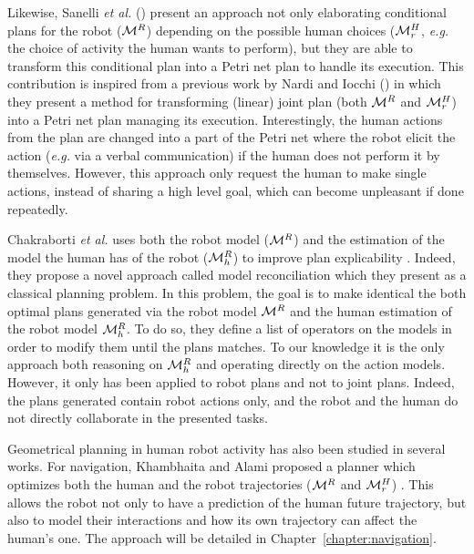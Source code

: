 \documentclass[a4paper,11pt,twoside]{StyleThese}
\begin{document}
Likewise, Sanelli \textit{et al.} (\cite{sanelli2017short}) present an approach not only elaborating conditional plans for the robot ($\mathcal{M}^R$)  depending on the possible human choices ($\mathcal{M}^H_r$, \textit{e.g.} the choice of activity the human wants to perform), but they are able to transform this conditional plan into a Petri net plan to handle its execution. This contribution is inspired from a previous work by Nardi and Iocchi (\cite{nardi2014representation}) in which they present a method for transforming (linear) joint plan (both $\mathcal{M}^R$ and $\mathcal{M}^H_r$) into a Petri net plan managing its execution. Interestingly, the human actions from the plan are changed into a part of the Petri net where the robot elicit the action (\textit{e.g.} via a verbal communication) if the human does not perform it by themselves. However, this approach only request the human to make single actions, instead of sharing a high level goal, which can become unpleasant if done repeatedly. 

Chakraborti \textit{et al.} uses both the robot model ($\mathcal{M}^R$) and the estimation of the model the human has of the robot ($\mathcal{M}^R_h$) to improve plan explicability \cite{chakraborti2017plan}. Indeed, they propose a novel approach called model reconciliation which they present as a classical planning problem. In this problem, the goal is to make identical the both optimal plans generated via the robot model $\mathcal{M}^R$ and the human estimation of the robot model $\mathcal{M}^R_h$. To do so, they define a list of operators on the models in order to modify them until the plans matches. To our knowledge it is the only approach both reasoning on $\mathcal{M}^R_h$ and operating directly on the action models. However, it only has been applied to robot plans and not to joint plans. Indeed, the plans generated contain robot actions only, and the robot and the human do not directly collaborate in the presented tasks.

Geometrical planning in human robot activity has also been studied in several works. For navigation, Khambhaita and Alami proposed a planner which optimizes both the human and the robot trajectories ($\mathcal{M}^R$ and $\mathcal{M}^H_r$) \cite{khambhaita_viewing_2017}. This allows the robot not only to have a prediction of the human future trajectory, but also to model their interactions and how its own trajectory can affect the human's one. The approach will be detailed in Chapter~\ref{chapter:navigation}.
\end{document}

